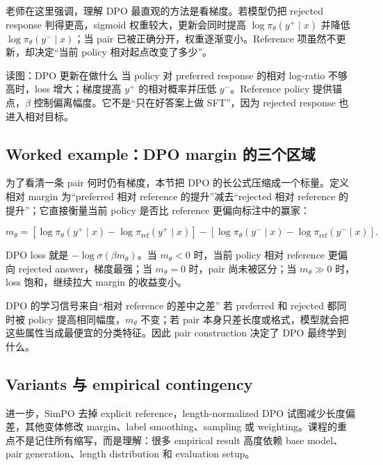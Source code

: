 \documentclass[a4paper]{article}
\begin{document}
老师在这里强调，理解 DPO 最直观的方法是看梯度。若模型仍把 rejected response 判得更高，sigmoid 权重较大，更新会同时提高 $\log\pi_\theta(y^+\mid x)$ 并降低 $\log\pi_\theta(y^-\mid x)$；当 pair 已被正确分开，权重逐渐变小。Reference 项虽然不更新，却决定“当前 policy 相对起点改变了多少”。

\begin{knowledgebox}{读图：DPO 更新在做什么}
当 policy 对 preferred response 的相对 log-ratio 不够高时，loss 增大；梯度提高 $y^+$ 的相对概率并压低 $y^-$。Reference policy 提供锚点，$\beta$ 控制偏离幅度。它不是“只在好答案上做 SFT”，因为 rejected response 也进入相对目标。
\end{knowledgebox}

\subsection{Worked example：DPO margin 的三个区域}

为了看清一条 pair 何时仍有梯度，本节把 DPO 的长公式压缩成一个标量。定义相对 margin 为“preferred 相对 reference 的提升”减去“rejected 相对 reference 的提升”；它直接衡量当前 policy 是否比 reference 更偏向标注中的赢家：

$$
m_\theta=
\left[\log\pi_\theta(y^+\mid x)-\log\pi_{\mathrm{ref}}(y^+\mid x)\right]
-\left[\log\pi_\theta(y^-\mid x)-\log\pi_{\mathrm{ref}}(y^-\mid x)\right].
$$

DPO loss 就是 $-\log\sigma(\beta m_\theta)$。当 $m_\theta<0$ 时，当前 policy 相对 reference 更偏向 rejected answer，梯度最强；当 $m_\theta=0$ 时，pair 尚未被区分；当 $m_\theta\gg0$ 时，loss 饱和，继续拉大 margin 的收益变小。

\begin{importantbox}{DPO 的学习信号来自“相对 reference 的差中之差”}
若 preferred 和 rejected 都同时被 policy 提高相同幅度，$m_\theta$ 不变；若 pair 本身只差长度或格式，模型就会把这些属性当成最便宜的分类特征。因此 pair construction 决定了 DPO 最终学到什么。
\end{importantbox}

\subsection{Variants 与 empirical contingency}

进一步，SimPO 去掉 explicit reference，length-normalized DPO 试图减少长度偏差，其他变体修改 margin、label smoothing、sampling 或 weighting。课程的重点不是记住所有缩写，而是理解：很多 empirical result 高度依赖 base model、pair generation、length distribution 和 evaluation setup。
\end{document}
